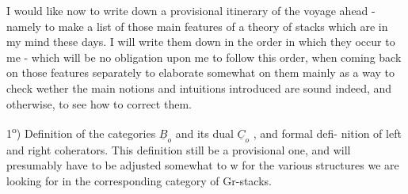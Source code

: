 
 I would like now to write down a provisional itinerary of the voyage
ahead - namely to make a list of those main features of a theory of
\margin{$\times$} stacks which are in my mind these days. I will write them down in the
order in which they occur to me - which will be no obligation upon me
to follow this order, when coming back on those features separately to
elaborate somewhat on them  mainly as a way to check wether the main
notions and intuitions introduced are sound indeed, and otherwise, to
see how to correct them.

1\textsuperscript{o}) Definition of the categories $\underline{B}_o$ and its dual $\underline{C}_o$ , and formal defi-%
nition of left and right coherators. This definition  still be a
provisional one, and will presumably have to be adjusted somewhat to
w for the various structures we are looking for in the corresponding
category of Gr-stacks.

